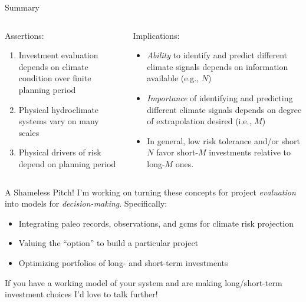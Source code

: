 \documentclass[
  10pt,     %
  handout   %
]{beamer}
\makeatletter
\newcommand*{\eg}{e.g.\@\xspace}
\newcommand*{\ie}{i.e.\@\xspace}
\makeatother
\begin{document}
\begin{frame}{Summary}
  \begin{columns}
    \begin{column}{0.5\textwidth}
      Assertions:
      \begin{enumerate}
        \item Investment evaluation depends on climate condition over finite planning period
        \item Physical hydroclimate systems vary on many scales
        \item Physical drivers of risk depend on planning period
      \end{enumerate}    
    \end{column}
    \begin{column}{0.5\textwidth}
      Implications:
      \begin{itemize}
        \item \emph{Ability} to identify and predict different climate signals depends on information available (\eg, $N$)
        \item \emph{Importance} of identifying and predicting different climate signals depends on degree of extrapolation desired (\ie, $M$)
        \item In general, low risk tolerance and/or short $N$ favor short-$M$ investments relative to long-$M$ ones.
      \end{itemize}    
    \end{column}
  \end{columns}
\end{frame}

\begin{frame}{A Shameless Pitch!}
  I'm working on turning these concepts for project \emph{evaluation} into models for \emph{decision-making}.
  Specifically:
  \begin{itemize}
    \item Integrating paleo records, observations, and \glspl{gcm} for climate risk projection
    \item Valuing the ``option'' to build a particular project
    \item Optimizing portfolios of long- and short-term investments
  \end{itemize}
  If you have a working model of your system and are making long/short-term investment choices I'd \alert{love to talk} further!
\end{frame}

\end{document}
